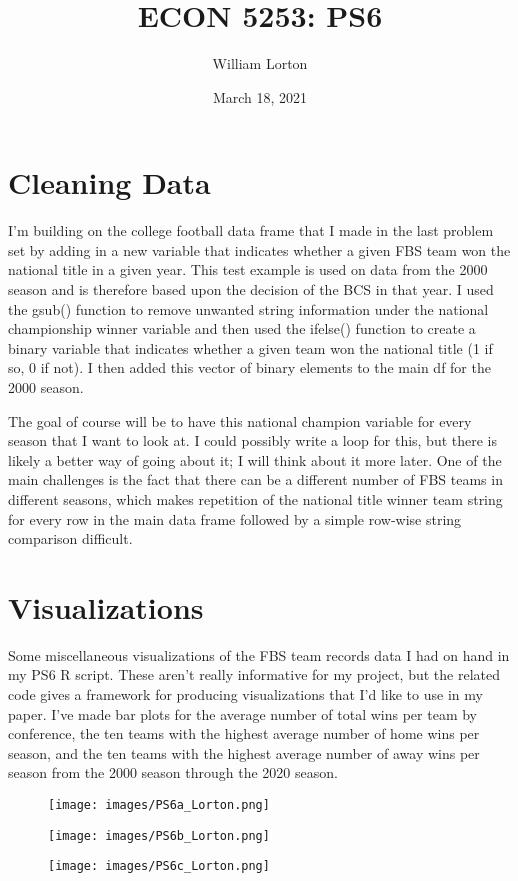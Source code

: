 \documentclass{article}
\title{ECON 5253: PS6}
\author{William Lorton}
\date{March 18, 2021}
\begin{document}
\maketitle

\section{Cleaning Data}

I'm building on the college football data frame that I made in the last problem set by adding in a new variable that indicates whether a given FBS team won the national title in a given year. This test example is used on data from the 2000 season and is therefore based upon the decision of the BCS in that year. I used the gsub() function to remove unwanted string information under the national championship winner variable and then used the ifelse() function to create a binary variable that indicates whether a given team won the national title (1 if so, 0 if not). I then added this vector of binary elements to the main df for the 2000 season.

\space 

The goal of course will be to have this national champion variable for every season that I want to look at. I could possibly write a loop for this, but there is likely a better way of going about it; I will think about it more later. One of the main challenges is the fact that there can be a different number of FBS teams in different seasons, which makes repetition of the national title winner team string for every row in the main data frame followed by a simple row-wise string comparison difficult.

\section{Visualizations}

Some miscellaneous visualizations of the FBS team records data I had on hand in my PS6 R script. These aren't really informative for my project, but the related code gives a framework for producing visualizations that I'd like to use in my paper. I've made bar plots for the average number of total wins per team by conference, the ten teams with the highest average number of home wins per season, and the ten teams with the highest average number of away wins per season from the 2000 season through the 2020 season.

\begin{figure}[h]
\texttt{[image: images/PS6a\_Lorton.png]}
\end{figure}

\begin{figure}[h]
\texttt{[image: images/PS6b\_Lorton.png]}
\end{figure}

\begin{figure}[h]
\texttt{[image: images/PS6c\_Lorton.png]}
\end{figure}
\end{document}
